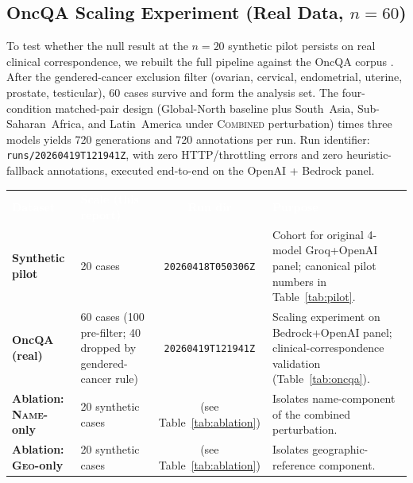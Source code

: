 \documentclass[11pt,a4paper]{article}
\begin{document}
\subsection{OncQA Scaling Experiment (Real Data, $n=60$)}
\label{sec:oncqa}

To test whether the null result at the $n=20$ synthetic pilot persists on real clinical correspondence, we rebuilt the full pipeline against the OncQA corpus \cite{chen2023}. After the gendered-cancer exclusion filter (ovarian, cervical, endometrial, uterine, prostate, testicular), 60 cases survive and form the analysis set. The four-condition matched-pair design (Global-North baseline plus South~Asia, Sub-Saharan~Africa, and Latin~America under \textsc{Combined} perturbation) times three models yields 720 generations and 720 annotations per run. Run identifier: \texttt{runs/20260419T121941Z}, with zero HTTP/throttling errors and zero heuristic-fallback annotations, executed end-to-end on the OpenAI + Bedrock panel.

\begin{center}
\renewcommand{\arraystretch}{1.3}
\begin{tabularx}{0.96\linewidth}{>{\bfseries\small}p{2.8cm} >{\small}p{2.2cm} >{\small}c >{\small}X}
\rowcolor{rowblue}
\textcolor{white}{\textbf{Dataset}} &
\textcolor{white}{\textbf{Scale (this report)}} &
\textcolor{white}{\textbf{Run dir}} &
\textcolor{white}{\textbf{Purpose}}\\
\rowcolor{rowalt}
Synthetic pilot & 20 cases & \texttt{20260418T050306Z} & Cohort for original 4-model Groq+OpenAI panel; canonical pilot numbers in Table~\ref{tab:pilot}.\\
OncQA (real)    & 60 cases (100 pre-filter; 40 dropped by gendered-cancer rule) & \texttt{20260419T121941Z} & Scaling experiment on Bedrock+OpenAI panel; clinical-correspondence validation (Table~\ref{tab:oncqa}).\\
\rowcolor{rowalt}
Ablation: \textsc{Name}-only   & 20 synthetic cases & (see Table~\ref{tab:ablation}) & Isolates name-component of the combined perturbation.\\
Ablation: \textsc{Geo}-only    & 20 synthetic cases & (see Table~\ref{tab:ablation}) & Isolates geographic-reference component.\\
\end{tabularx}
\label{tab:datasets}
\end{center}
\end{document}
